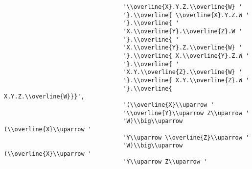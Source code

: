 \begin{verbatim}
                                  '\\overline{X}.Y.Z.\\overline{W} '
                                  '}.\\overline{ \\overline{X}.Y.Z.W '
                                  '}.\\overline{ '
                                  'X.\\overline{Y}.\\overline{Z}.W '
                                  '}.\\overline{ '
                                  'X.\\overline{Y}.Z.\\overline{W} '
                                  '}.\\overline{ X.\\overline{Y}.Z.W '
                                  '}.\\overline{ '
                                  'X.Y.\\overline{Z}.\\overline{W} '
                                  '}.\\overline{ X.Y.\\overline{Z}.W '
                                  '}.\\overline{ X.Y.Z.\\overline{W}}}',
                                  '(\\overline{X}\\uparrow '
                                  '\\overline{Y}\\uparrow Z\\uparrow '
                                  'W)\\big\\uparrow (\\overline{X}\\uparrow '
                                  'Y\\uparrow \\overline{Z}\\uparrow '
                                  'W)\\big\\uparrow (\\overline{X}\\uparrow '
                                  'Y\\uparrow Z\\uparrow '

\end{verbatim}
